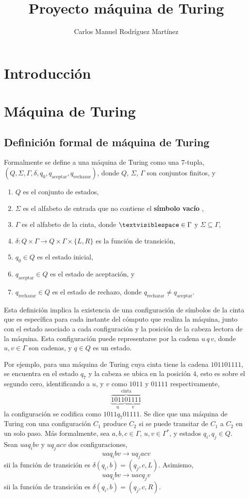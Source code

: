 \documentclass[10pt,a4paper]{article}
\author{Carlos Manuel Rodríguez Martínez}
\title{Proyecto máquina de Turing}
\begin{document}
\section{Introducción}

\section{Máquina de Turing}

\subsection{Definición formal de máquina de Turing}

Formalmente se define a una máquina de Turing como una 7-tupla, $(Q,\Sigma, \Gamma, \delta, q_0, q_{\text{aceptar}},q_{\text{rechazar}})$, donde $Q$, $\Sigma$, $\Gamma$ son conjuntos finitos, y
\begin{enumerate}
	\item $Q$ es el conjunto de estados,
	\item $\Sigma$ es el alfabeto de entrada que no contiene el \textbf{símbolo vacío} \textvisiblespace,
	\item $\Gamma$ es el alfabeto de la cinta, donde $\textvisiblespace \in \Gamma$ y $\Sigma \subseteq \Gamma$,
	\item $\delta : Q \times \Gamma \rightarrow Q \times \Gamma \times \{ L, R \}$ es la función de transición,
	\item $q_0 \in Q$ es el estado inicial,
	\item $q_{\text{aceptar}} \in Q$ es el estado de aceptación, y
	\item $q_{\text{rechazar}} \in Q$ es el estado de rechazo, donde $q_{\text{rechazar}} \neq q_{\text{aceptar}}$.
\end{enumerate}

Esta definición implica la existencia de una configuración de símbolos de la cinta que es específica para cada instante del cómputo que realiza la máquina, junto con el estado asociado a cada configuración y la posición de la cabeza lectora de la máquina. Esta configuración puede representarse por la cadena $u \, q \, v$, donde $u, v \in \Gamma$ son cadenas, y $q \in Q$ es un estado.

Por ejemplo, para una máquina de Turing cuya cinta tiene la cadena $101101111$, se encuentra en el estado $q_7$ y la cabeza se ubica en la posición $4$, esto es sobre el segundo cero, identificando a $u$, y $v$ como $1011$ y $01111$ respectivamente,
\[	
\overbrace{ \underbrace{1011}_\text{u} \underbrace{01111}_\text{v}}^\text{cinta}
\]
la configuración se codifica como $1011q_7 01111$.
Se dice que una máquina de Turing con una configuración $C_1$ produce $C_2$ si se puede transitar de $C_1$ a $C_2$ en un solo paso. Más formalmente, sea $a, b, c \in \Gamma$, $u, v \in \Gamma^*$, y estados $q_i, q_j \in Q$. Sean $u a q_i b v$ y $u q_j a c v$ dos configuraciones,
\[
	u a q_i b v \rightarrow u q_j a c v
\]
sii la función de transición es $\delta(q_i, b) = (q_j, c, L)$. Asimismo,
\[
	u a q_i b v \rightarrow u a c q_j v
\]
sii la función de transición es $\delta(q_i, b) = (q_j, c, R)$.
\end{document}
